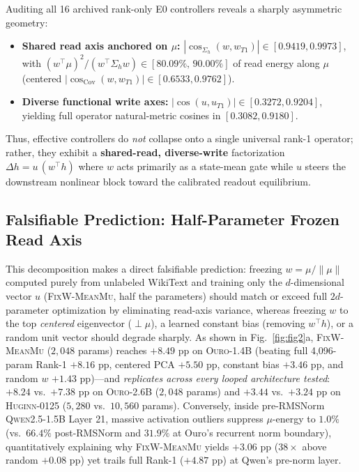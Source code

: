 \documentclass[10pt,twocolumn]{article}
\begin{document}
Auditing all 16 archived rank-only E0 controllers reveals a sharply asymmetric geometry:
\begin{itemize}
\item \textbf{Shared read axis anchored on $\mu$:} $|\cos_{\Sigma_h}(w, w_{T1})|\in[0.9419, 0.9973]$, with $(w^\top \mu)^2/(w^\top \Sigma_h w)\in[\mathbf{80.09\%},\,\mathbf{90.00\%}]$ of read energy along $\mu$ (centered $|\cos_{\mathrm{Cov}}(w,w_{T1})|\in[0.6533,0.9762]$).
\item \textbf{Diverse functional write axes:} $|\cos(u, u_{T1})|\in[0.3272, 0.9204]$, yielding full operator natural-metric cosines in $[0.3082, 0.9180]$.
\end{itemize}
Thus, effective controllers do \emph{not} collapse onto a single universal rank-1 operator; rather, they exhibit a \textbf{shared-read, diverse-write} factorization $\Delta h = u\,(w^\top h)$ where $w$ acts primarily as a state-mean gate while $u$ steers the downstream nonlinear block toward the calibrated readout equilibrium.

\subsection{Falsifiable Prediction: Half-Parameter Frozen Read Axis}
This decomposition makes a direct falsifiable prediction: freezing $w = \mu/\|\mu\|$ computed purely from unlabeled WikiText and training only the $d$-dimensional vector $u$ (\textsc{FixW-MeanMu}, half the parameters) should match or exceed full $2d$-parameter optimization by eliminating read-axis variance, whereas freezing $w$ to the top \emph{centered} eigenvector ($\perp \mu$), a learned constant bias (removing $w^\top h$), or a random unit vector should degrade sharply.
As shown in Fig.~\ref{fig:fig2}a, \textsc{FixW-MeanMu} ($2{,}048$ params) reaches $+8.49$ pp on \textsc{Ouro-1.4B} (beating full 4,096-param Rank-1 $+8.16$ pp, centered PCA $+5.50$ pp, constant bias $+3.46$ pp, and random $w$ $+1.43$ pp)---and \emph{replicates across every looped architecture tested}: $+8.24$ vs.\ $+7.38$ pp on \textsc{Ouro-2.6B} ($2{,}048$ params) and $+3.44$ vs.\ $+3.24$ pp on \textsc{Huginn-0125} ($5{,}280$ vs.\ $10{,}560$ params).
Conversely, inside pre-RMSNorm \textsc{Qwen2.5-1.5B} Layer 21, massive activation outliers \citep{sun2024massive} suppress $\mu$-energy to $1.0\%$ (vs.\ $66.4\%$ post-RMSNorm and $31.9\%$ at Ouro's recurrent norm boundary), quantitatively explaining why \textsc{FixW-MeanMu} yields $+3.06$ pp ($38\times$ above random $+0.08$ pp) yet trails full Rank-1 ($+4.87$ pp) at Qwen's pre-norm layer.
\end{document}
